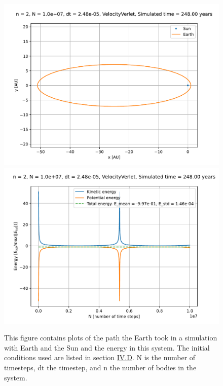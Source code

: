 \documentclass[reprint,english,notitlepage]{revtex4-1}  %
\begin{document}
\begin{figure}[H]
\includegraphics[scale=0.5]{../data/figures/escapevelocity/se_esc_8-8_orbit2D.pdf}
\includegraphics[scale=0.5]{../data/figures/escapevelocity/se_esc_8-8_energy.pdf}
\caption{This figure contains plots of the path the Earth took in a simulation with Earth and the Sun and the energy in this system. The initial conditions used are listed in section \hyperref[sec:IV:d]{IV.D}. N is the number of timesteps, dt the timestep, and n the number of bodies in the system.}
\label{fig:escvel_88}
\end{figure}
\end{document}
